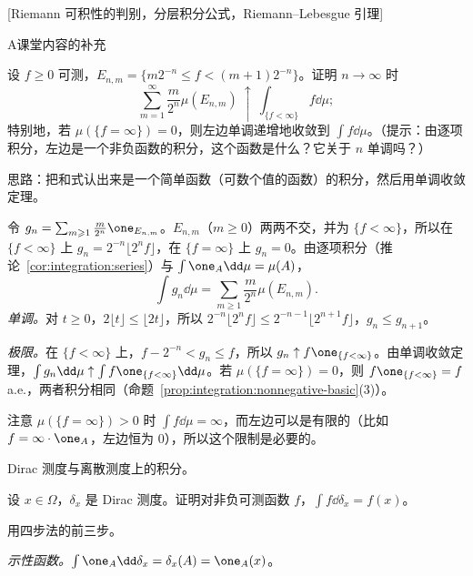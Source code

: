 [Riemann 可积性的判别，分层积分公式，Riemann–Lebesgue 引理]
\label{hw:integration}


\begin{exercises}{A}{课堂内容的补充}
\item\label{ex:integration:A1} 设 $f\geqslant0$ 可测，$E_{n,m}=\{m2^{-n}\leqslant f<(m+1)2^{-n}\}$。证明 $n\to\infty$ 时
\[
\sum_{m=1}^\infty\frac m{2^n}\mu(E_{n,m})\ \uparrow\ \int_{\{f<\infty\}}f\dd\mu ;
\]
特别地，若 $\mu(\{f=\infty\})=0$，则左边单调递增地收敛到 $\int f\dd\mu$。（提示：由逐项积分，左边是一个非负函数的积分，这个函数是什么？它关于 $n$ 单调吗？）
\begin{solution}
思路：把和式认出来是一个简单函数（可数个值的函数）的积分，然后用单调收敛定理。

令 $g_n=\sum_{m\geqslant1}\frac m{2^n}\one_{E_{n,m}}$。$E_{n,m}$（$m\geqslant0$）两两不交，并为 $\{f<\infty\}$，所以在 $\{f<\infty\}$ 上 $g_n=2^{-n}\lfloor2^nf\rfloor$，在 $\{f=\infty\}$ 上 $g_n=0$。由逐项积分（推论~\ref{cor:integration:series}）与 $\int\one_A\dd\mu=\mu(A)$，
\[
\int g_n\dd\mu=\sum_{m\geqslant1}\frac m{2^n}\mu(E_{n,m}).
\]
\emph{单调。}对 $t\geqslant0$，$2\lfloor t\rfloor\leqslant\lfloor2t\rfloor$，所以 $2^{-n}\lfloor2^nf\rfloor\leqslant2^{-n-1}\lfloor2^{n+1}f\rfloor$，$g_n\leqslant g_{n+1}$。

\emph{极限。}在 $\{f<\infty\}$ 上，$f-2^{-n}<g_n\leqslant f$，所以 $g_n\uparrow f\one_{\{f<\infty\}}$。由单调收敛定理，$\int g_n\dd\mu\uparrow\int f\one_{\{f<\infty\}}\dd\mu$。若 $\mu(\{f=\infty\})=0$，则 $f\one_{\{f<\infty\}}=f$ a.e.，两者积分相同（命题~\ref{prop:integration:nonnegative-basic}(3)）。

注意 $\mu(\{f=\infty\})>0$ 时 $\int f\dd\mu=\infty$，而左边可以是有限的（比如 $f=\infty\cdot\one_A$，左边恒为 $0$），所以这个限制是必要的。
\end{solution}

\item\label{ex:integration:A2} Dirac 测度与离散测度上的积分。
\begin{questions}
\item 设 $x\in\Omega$，$\delta_x$ 是 Dirac 测度。证明对非负可测函数 $f$，$\int f\dd\delta_x=f(x)$。
\begin{solution}
用四步法的前三步。

\emph{示性函数。}$\int\one_A\dd\delta_x=\delta_x(A)=\one_A(x)$。


\end{solution}
\end{questions}
\end{exercises}
